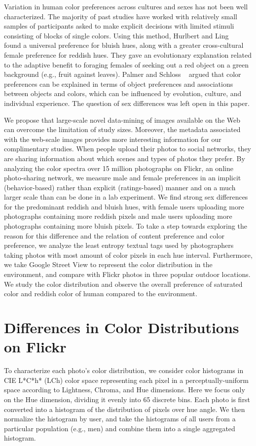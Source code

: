 Variation in human color preferences across cultures and sexes has not been well characterized. The majority of past studies have worked with relatively small samples of participants asked to make explicit decisions with limited stimuli consisting of blocks of single colors. 
Using this method, Hurlbert and Ling ~\cite{} found a universal preference for bluish hues, along with a greater cross-cultural female preference for reddish hues.
They gave an evolutionary explanation related to the adaptive benefit to foraging females of seeking out a red object on a green background (e.g., fruit against leaves).  
Palmer and Schloss ~\cite{} argued that color preferences can be explained in terms of object preferences and associations between objects and colors, which can be influenced by evolution, culture, and individual experience.  The question of sex differences was left open in this paper.

We propose that large-scale novel data-mining of images available on the Web can overcome the limitation of study sizes. Moreover, the metadata associated with the web-scale images provides more interesting information for our complimentary studies.
When people upload their photos to social networks, they are sharing information about which scenes and types of photos they prefer.
By analyzing the color spectra over 15 million photographs on Flickr, an online photo-sharing network, we measure male and female preferences in an implicit (behavior-based) rather than explicit (ratings-based) manner and on a much larger scale than can be done in a lab experiment.
We find strong sex differences for the predominant reddish and bluish hues, with female users uploading more photographs containing more reddish pixels and male users uploading more photographs containing more bluish pixels.
To take a step towards exploring the reason for this difference and the relation of content preference and color preference, we analyze the least entropy textual tags used by photographers taking photos with most amount of color pixels in each hue interval. Furthermore, we take Google Street View to represent the color distribution in the environment, and compare with Flickr photos in three popular outdoor locations. We study the color distribution and observe the overall preference of saturated color and reddish color of human compared to the environment.

\section{Differences in Color Distributions on Flickr}
To characterize each photo's color distribution, we consider color histograms in CIE L*C*h* (LCh) color space representing each pixel in a perceptually-uniform space according to Lightness, Chroma, and Hue dimensions.
Here we focus only on the Hue dimension, dividing it evenly into 65 discrete bins.
Each photo is first converted into a histogram of the distribution of pixels over hue angle. We then normalize the histogram by user, and take the histograms of all users from a particular population (e.g., men) and combine them into a single aggregated histogram.

